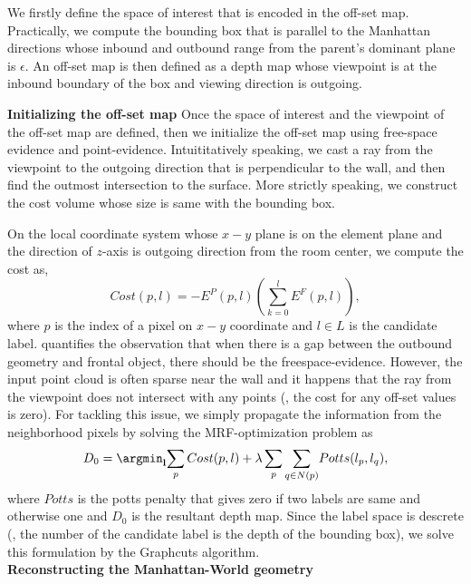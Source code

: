 We firstly define the space of interest that is encoded in the off-set map.  Practically, we compute the bounding box that is parallel to the Manhattan directions whose inbound and outbound range from the parent's dominant plane is $\epsilon$. An off-set map is then defined as a depth map whose viewpoint is at the inbound boundary of the box and viewing direction is outgoing.

\noindent\textbf{Initializing the off-set map}
Once the space of interest and the viewpoint of the off-set map are defined, then we initialize the off-set map using free-space evidence and point-evidence. Intuititatively speaking, we cast a ray from the viewpoint to the outgoing direction that is perpendicular to the wall, and then find the outmost intersection to the surface. More strictly speaking, we construct the cost volume whose size is same with the bounding box. 

On the local coordinate system whose $x-y$ plane is on the element plane and the direction of $z$-axis is outgoing direction from the room center, we compute the cost as,
\begin{equation}
Cost(p,l) = -E^P(p,l)\left(\sum_{k=0}^{l} E^F(p,l)\right), \label{eq:costdetail}
\end{equation}
where $p$ is the index of a pixel on $x-y$ coordinate and $l \in L$ is the candidate label.  quantifies the observation that when there is a gap between the outbound geometry and frontal object, there should be the freespace-evidence. However, the input point cloud is often sparse near the wall and it happens that the ray from the viewpoint does not intersect with any points (\ie, the cost for any off-set values is zero). For tackling this issue, we simply propagate the information from the neighborhood pixels by solving the MRF-optimization problem as
\begin{equation}
D_0 = \argmin_{\textbf{l}}{\sum_{p}Cost(p,l) + \lambda \sum_p{\sum_{q\in N(p)}}{Potts(l_p, l_q)}},
\end{equation}
where $Potts$ is the potts penalty that gives zero if two labels are same and otherwise one and $D_0$ is the resultant depth map. Since the label space is descrete (\ie, the number of the candidate label is the depth of the bounding box), we solve this formulation by the Graphcuts algorithm.\\

\noindent\textbf{Reconstructing the Manhattan-World geometry}

